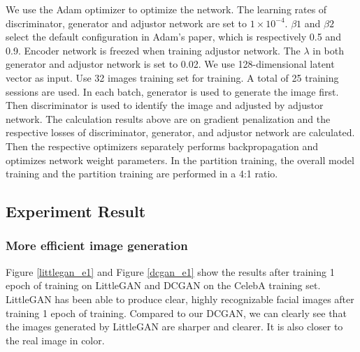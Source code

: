 We use the Adam optimizer to optimize the network.
The learning rates of discriminator, generator and adjustor network are set to $1\times10^{-4}$.
$\beta1$ and $\beta2$ select the default configuration in Adam's paper, which is respectively 0.5 and 0.9.
Encoder network is freezed when training adjustor network.
The $\lambda$ in both generator and adjustor network is set to 0.02.
We use 128-dimensional latent vector as input.
Use 32 images training set for training.
A total of 25 training sessions are used.
In each batch, generator is used to generate the image first.
Then discriminator is used to identify the image and adjusted by adjustor network.
The calculation results above are on gradient penalization and the respective losses of discriminator, generator, and adjustor network are calculated.
Then the respective optimizers separately performs backpropagation and optimizes network weight parameters.
In the partition training, the overall model training and the partition training are performed in a 4:1 ratio.

\subsection{Experiment Result}
\subsubsection*{More efficient image generation}
Figure \ref{littlegan_e1} and Figure \ref{dcgan_e1} show the results after training 1 epoch of training on LittleGAN and DCGAN on the CelebA training set.
LittleGAN has been able to produce clear, highly recognizable facial images after training 1 epoch of training.
Compared to our DCGAN, we can clearly see that the images generated by LittleGAN are sharper and clearer.
It is also closer to the real image in color.

